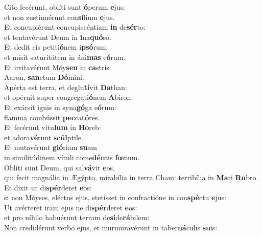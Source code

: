 \evenverse Cito fecérunt, oblíti sunt \textbf{ó}perum \textbf{e}jus:~\*\\
\evenverse et non sustinuérunt con\textbf{sí}lium \textbf{e}jus.\\
\oddverse Et concupiérunt concupiscéntiam \textbf{in} de\textbf{sér}to:~\*\\
\oddverse et tentavérunt Deum in \textbf{i}na\textbf{quó}so.\\
\evenverse Et dedit eis petiti\textbf{ó}nem i\textbf{psó}rum:~\*\\
\evenverse et misit saturitátem in áni\textbf{mas} e\textbf{ó}rum.\\
\oddverse Et irritavérunt Móy\textbf{sen} in \textbf{ca}stris:~\*\\
\oddverse Aaron, \textbf{san}ctum \textbf{Dó}mini.\\
\evenverse Apérta est terra, et deglu\textbf{tí}vit \textbf{Da}than:~\*\\
\evenverse et opéruit super congregati\textbf{ó}nem \textbf{A}biron.\\
\oddverse Et exársit ignis in syna\textbf{gó}ga e\textbf{ó}rum:~\*\\
\oddverse flamma combússit \textbf{pec}ca\textbf{tó}res.\\
\evenverse Et fecérunt vítu\textbf{lum} in \textbf{Ho}reb:~\*\\
\evenverse et adora\textbf{vé}runt \textbf{scúl}ptile.\\
\oddverse Et mutavérunt \textbf{gló}riam \textbf{su}am~\*\\
\oddverse in similitúdinem vítuli come\textbf{dén}tis \textbf{fœ}num.\\
\evenverse Oblíti sunt Deum, qui sal\textbf{vá}vit \textbf{e}os,~\*\\
\evenverse qui fecit magnália in Ægýpto, mirabília in terra Cham: terribília in \textbf{Ma}ri \textbf{Ru}bro.\\
\oddverse Et dixit ut di\textbf{spér}deret \textbf{e}os:~\*\\
\oddverse si non Móyses, eléctus ejus, stetísset in confractióne in con\textbf{spé}ctu \textbf{e}jus:\\
\evenverse Ut avérteret iram ejus ne di\textbf{spér}deret \textbf{e}os:~\*\\
\evenverse et pro níhilo habuérunt terram de\textbf{si}de\textbf{rá}bilem:\\
\oddverse Non credidérunt verbo ejus, et murmuravérunt in taber\textbf{ná}culis \textbf{su}is:~\*\\
